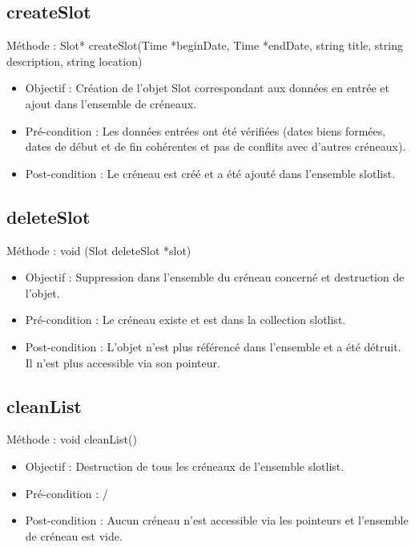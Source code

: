    		\subsection*{createSlot}
            Méthode : Slot* createSlot(Time *beginDate, Time *endDate, string title, string description, string location)
			\begin{itemize}
				\item Objectif  : Création de l'objet Slot correspondant aux données en entrée et ajout dans l'ensemble de créneaux.
				\item Pré-condition : Les données entrées ont été vérifiées (dates biens formées, dates de début et de fin cohérentes et pas de conflits avec d'autres créneaux).
				\item Post-condition : Le créneau est créé et a été ajouté dans l'ensemble slotlist.
			\end{itemize}
            
   		\subsection*{deleteSlot}
            Méthode : void (Slot deleteSlot *slot)
			\begin{itemize}
				\item Objectif  : Suppression dans l'ensemble du créneau concerné et destruction de l'objet.
				\item Pré-condition : Le créneau existe et est dans la collection slotlist.
				\item Post-condition : L'objet n'est plus référencé dans l'ensemble et a été détruit. Il n'est plus accessible via son pointeur.
			\end{itemize}
            
   		\subsection*{cleanList}
            Méthode : void cleanList()
			\begin{itemize}
				\item Objectif  : Destruction de tous les créneaux de l'ensemble slotlist.
				\item Pré-condition : /
				\item Post-condition : Aucun créneau n'est accessible via les pointeurs et l'ensemble de créneau est vide.
			\end{itemize}
            
            

